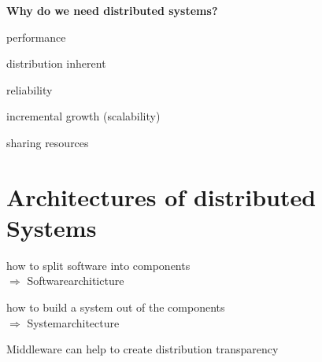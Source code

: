 \documentclass[ngerman,a4paper]{report}
\begin{document}
\textbf{Why do we need distributed systems?}\\
\begin{compactitem}
\item performance
\item distribution inherent
\item reliability
\item incremental growth (scalability)
\item sharing resources
\end{compactitem}

\chapter{Architectures of distributed Systems}

\begin{compactitem}
\item how to split software into components\\
$\Rightarrow$ Softwarearchiticture
\item how to build a system out of the components\\
$\Rightarrow$ Systemarchitecture
\end{compactitem}

Middleware can  help to create distribution transparency\\
\end{document}
